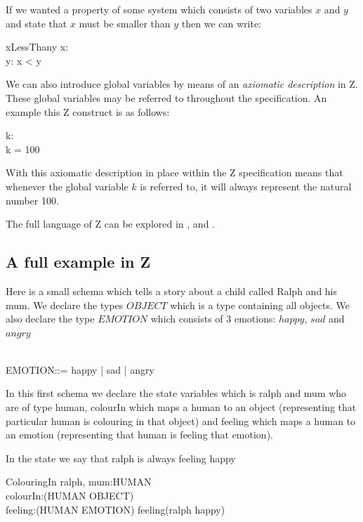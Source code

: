 If we wanted a property of some system which consists of two variables $x$ and $y$ and state that $x$ must be smaller than $y$ then we can write:

\begin{schema}{xLessThany}
x: \nat \\
y: \nat
\where
x < y
\end{schema}

We can also introduce global variables by means of an \textit{axiomatic description} in Z. These global variables may be referred to throughout the specification. An example this Z construct is as follows:

\begin{axdef}
k: \nat \\
\where
k = 100
\end{axdef}

With this axiomatic description in place within the Z specification means that whenever the global variable $k$ is referred to, it will always represent the natural number 100.

The full language of Z can be explored in \cite{spiveyreferencemanual}, \cite{essenceofz} and \cite{Woodcock:1996:UZS:235337}.

\subsection{A full example in Z}
Here is a small schema which tells a story about a child called Ralph and his mum. We declare the types $OBJECT$ which is a type containing all objects. We also declare the type $EMOTION$ which consists of 3 emotions: $happy$, $sad$ and $angry$

\begin{zed}
[OBJECT] \\
EMOTION::= happy | sad | angry
\end{zed}

In this first schema we declare the state variables which is ralph and mum who are of type human, colourIn which maps a human to an object (representing that particular human is colouring in that object) and feeling which maps a human to an emotion (representing that human is feeling that emotion).

In the state we say that ralph is always feeling happy
\begin{schema}{ColouringIn}
ralph, mum:HUMAN \\
colourIn:(HUMAN \pfun OBJECT) \\
feeling:(HUMAN \pfun EMOTION)
\where
feeling(ralph \mapsto happy)
\end{schema}

